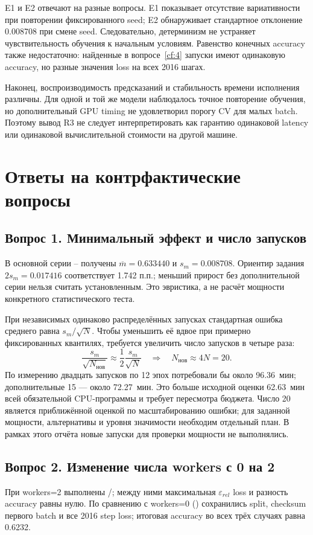E1 и E2 отвечают на разные вопросы. E1 показывает отсутствие вариативности при повторении фиксированного seed; E2 обнаруживает стандартное отклонение 0.008708 при смене seed. Следовательно, детерминизм не устраняет чувствительность обучения к начальным условиям. Равенство конечных accuracy также недостаточно: найденные в вопросе~\ref{cf:4} запуски имеют одинаковую accuracy, но разные значения loss на всех 2016 шагах.

Наконец, воспроизводимость предсказаний и стабильность времени исполнения различны. Для одной и той же модели наблюдалось точное повторение обучения, но дополнительный GPU timing не удовлетворил порогу CV для малых batch. Поэтому вывод R3 не следует интерпретировать как гарантию одинаковой latency или одинаковой вычислительной стоимости на другой машине.

\section{Ответы на контрфактические вопросы}
\subsection{Вопрос 1. Минимальный эффект и число запусков}\label{cf:1}
В основной серии -- получены $\overline m=0.633440$ и $s_m=0.008708$. Ориентир задания $2s_m=0.017416$ соответствует 1.742 п.п.; меньший прирост без дополнительной серии нельзя считать установленным. Это эвристика, а не расчёт мощности конкретного статистического теста.

При независимых одинаково распределённых запусках стандартная ошибка среднего равна $s_m/\sqrt N$. Чтобы уменьшить её вдвое при примерно фиксированных квантилях, требуется увеличить число запусков в четыре раза:
\begin{equation}
\frac{s_m}{\sqrt{N_{\text{нов}}}}\approx
\frac12\frac{s_m}{\sqrt N}
\quad\Longrightarrow\quad N_{\text{нов}}\approx4N=20.
\label{eq:power}
\end{equation}
По измерению  двадцать запусков по 12 эпох потребовали бы около 96.36~мин; дополнительные 15 --- около 72.27~мин. Это больше исходной оценки 62.63~мин всей обязательной CPU-программы и требует пересмотра бюджета. Число 20 является приближённой оценкой по масштабированию ошибки; для заданной мощности, альтернативы и уровня значимости необходим отдельный план. В рамках этого отчёта новые запуски для проверки мощности не выполнялись.

\subsection{Вопрос 2. Изменение числа workers с 0 на 2}\label{cf:2}
При workers=2 выполнены /; между ними максимальная $\varepsilon_{rel}$ loss и разность accuracy равны нулю. По сравнению с workers=0 () сохранились split, checksum первого batch и все 2016 step loss; итоговая accuracy во всех трёх случаях равна 0.6232.

